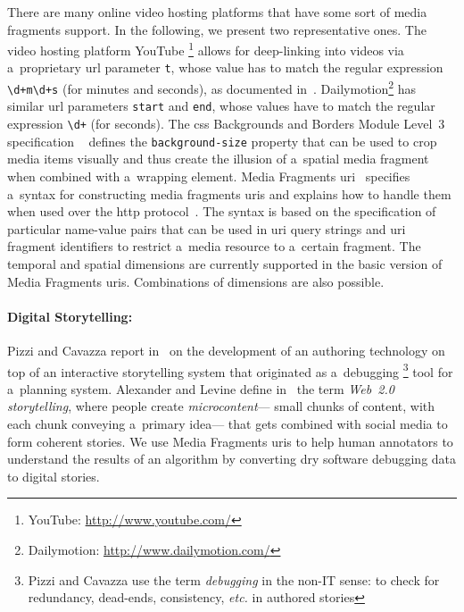 There are many online video hosting platforms
that have some sort of media fragments support.
In the following, we present two representative ones.
The video hosting platform YouTube%
\footnote{YouTube: \url{http://www.youtube.com/}}
allows for deep-linking into videos
via a~proprietary {\sc url} parameter \texttt{t},
whose value has to match the regular expression
\texttt{\textbackslash d+m\textbackslash d+s} (for minutes and seconds),
as documented in~\cite{youtube2008link}.
Dailymotion\footnote{Dailymotion: \url{http://www.dailymotion.com/}}
has similar {\sc url} parameters \texttt{start} and \texttt{end},
whose values have to match the regular expression
\texttt{\textbackslash d+} (for seconds).
The {\sc css} Backgrounds and Borders Module Level~3 specification%
~\cite{bos2012css3} defines the \texttt{background-size} property
that can be used to crop media items visually
and thus create the illusion of a~spatial media fragment
when combined with a~wrapping element.
Media Fragments {\sc uri}~\cite{troncy2012mediafragments}
specifies a~syntax for constructing media fragments {\sc uri}s
and explains how to handle them
when used over the {\sc http} protocol~\cite{fielding1999http}.
The syntax is based on the specification of particular name-value pairs
that can be used in {\sc uri} query strings and {\sc uri} fragment identifiers
to restrict a~media resource to a~certain fragment.
The temporal and spatial dimensions are currently supported
in the basic version of Media Fragments {\sc uri}s.
Combinations of dimensions are also possible.

\paragraph{Digital Storytelling:}

Pizzi and Cavazza report in~\cite{pizzi2008debugging}
on the development of an authoring technology
on top of an interactive storytelling system
that originated as a~debugging%
\footnote{Pizzi and Cavazza use the term \emph{debugging}
in the non-IT sense: to check for redundancy, dead-ends, consistency, \emph{etc.}
in authored stories} tool for a~planning system.
Alexander and Levine define in~\cite{alexander2008storytelling}
the term \emph{Web~2.0 storytelling},
where people create \emph{microcontent}---%
small chunks of content, with each chunk conveying a~primary idea---%
that gets combined with social media to form coherent stories.
We use Media Fragments {\sc uri}s to help human annotators
to understand the results of an algorithm
by converting dry software debugging data to digital stories.


